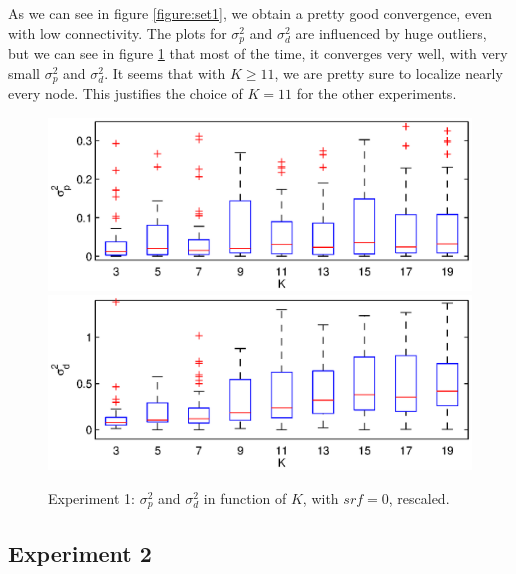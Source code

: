 \documentclass[letterpaper, 10 pt, conference]{ieeeconf}  %
\begin{document}
As we can see in figure \ref{figure:set1}, we obtain a pretty good convergence, even with low connectivity. The plots for $\sigma_p^2$ and $\sigma_d^2$ are influenced by huge outliers, but we can see in figure \ref{fig:set1-rescaled} that most of the time, it converges very well, with very small $\sigma_p^2$ and $\sigma_d^2$. It seems that with $K \geq 11$, we are pretty sure to localize nearly every node. This justifies the choice of $K=11$ for the other experiments.

\begin{figure}[ht!]
\centering
\includegraphics[width=1\columnwidth]{set1-sp-nosrf-ylim.eps}
\includegraphics[width=1\columnwidth]{set1-sd-nosrf-ylim.eps}
\caption{\label{fig:set1-rescaled}Experiment 1: $\sigma_p^2$ and $\sigma_d^2$ in function of $K$, with $srf=0$, rescaled.}
\end{figure}

\subsection{Experiment 2}
\end{document}
